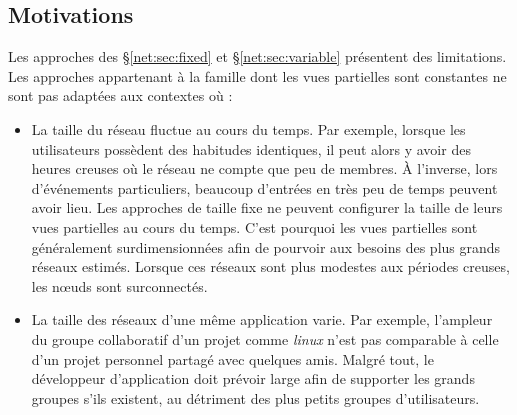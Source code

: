 
\subsection{Motivations}
\label{net:subsec:motivations}

Les approches des §\ref{net:sec:fixed} et §\ref{net:sec:variable} présentent des
limitations. Les approches appartenant à la famille dont les vues partielles
sont constantes ne sont pas adaptées aux contextes où :
\begin{itemize}
\item La taille du réseau fluctue au cours du temps. Par exemple, lorsque les
  utilisateurs possèdent des habitudes identiques, il peut alors y avoir des
  heures creuses où le réseau ne compte que peu de membres. À l'inverse, lors
  d'événements particuliers, beaucoup d'entrées en très peu de temps peuvent
  avoir lieu.  Les approches de taille fixe ne peuvent configurer la taille de
  leurs vues partielles au cours du temps. C'est pourquoi les vues partielles
  sont généralement surdimensionnées afin de pourvoir aux besoins des plus
  grands réseaux estimés. Lorsque ces réseaux sont plus modestes aux périodes
  creuses, les nœuds sont surconnectés.
\item La taille des réseaux d'une même application varie. Par exemple, l'ampleur
  du groupe collaboratif d'un projet comme \emph{linux} n'est pas comparable à
  celle d'un projet personnel partagé avec quelques amis. Malgré tout, le
  développeur d'application doit prévoir large afin de supporter les grands
  groupes s'ils existent, au détriment des plus petits groupes d'utilisateurs.
\end{itemize}


